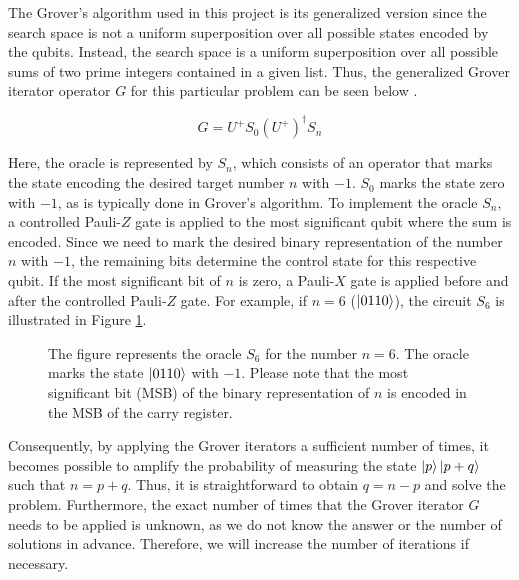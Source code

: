\documentclass[aps,prapplied,longbibliography]{article}
\begin{document}
    The Grover's algorithm used in this project is its generalized version since the search space is not a uniform superposition over all possible states encoded by the qubits. Instead, the search space is a uniform superposition over all possible sums of two prime integers contained in a given list. Thus, the generalized Grover iterator operator $G$ for this particular problem can be seen below \cite{brassard1998quantum}.

    \begin{equation}
        G = U^+ S_0 (U^+)^{\dagger} S_{n}
    \end{equation}

    Here, the oracle is represented by $S_n$, which consists of an operator that marks the state encoding the desired target number $n$ with $-1$. $S_0$ marks the state zero with $-1$, as is typically done in Grover's algorithm. To implement the oracle $S_n$, a controlled Pauli-$Z$ gate is applied to the most significant qubit where the sum is encoded. Since we need to mark the desired binary representation of the number $n$ with $-1$, the remaining bits determine the control state for this respective qubit. If the most significant bit of $n$ is zero, a Pauli-$X$ gate is applied before and after the controlled Pauli-$Z$ gate. For example, if $n=6$ ($\ket{0110}$), the circuit $S_6$ is illustrated in Figure \ref{fig:Oracle}.

    \begin{figure}[h]
        \centering
        \caption{The figure represents the oracle $S_6$ for the number $n=6$. The oracle marks the state $\ket{0110}$ with $-1$. Please note that the most significant bit (MSB) of the binary representation of $n$ is encoded in the MSB of the carry register.}
        \label{fig:Oracle}
    \end{figure}

    Consequently, by applying the Grover iterators a sufficient number of times, it becomes possible to amplify the probability of measuring the state $\ket{p}\ket{p+q}$ such that $n=p+q$. Thus, it is straightforward to obtain $q = n-p$ and solve the problem. Furthermore, the exact number of times that the Grover iterator $G$ needs to be applied is unknown, as we do not know the answer or the number of solutions in advance. Therefore, we will increase the number of iterations if necessary.
\end{document}

